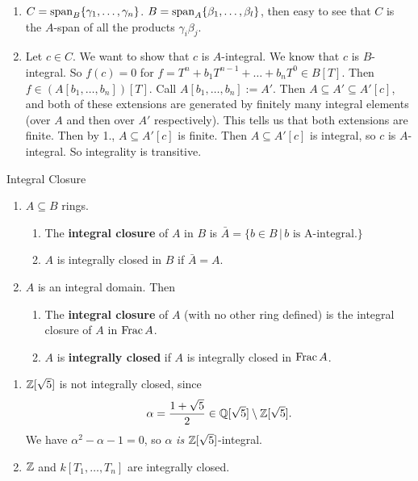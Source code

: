 \documentclass{article}
\begin{document}
\proof \hspace{0.1cm}
\begin{enumerate}
    \item $C = \operatorname{span}_{B} \{\gamma_{1}, \dots, \gamma_{n}\}$. $B = \operatorname{span}_{A}\{ \beta_{1}, \dots, \beta_{l}\}$, then easy to see that $C$ is the $A$-span of all the products $\gamma_{i}\beta_{j}$.
    \item Let $c \in C$. We want to show that $c$ is $A$-integral. We know that $c$ is $B$-integral. So $f(c)=0$ for $f= T^{n} + b_{1}T^{n-1} + \dots + b_{n}T^{0} \in B[T]$. Then $f \in (A[b_{1},\dots, b_{n}])[T]$. Call $A[b_{1}, \dots, b_{n}] := A'$. Then $A \subseteq A' \subseteq A'[c]$, and both of these extensions are generated by finitely many integral elements (over $A$ and then over $A'$ respectively). This tells us that both extensions are finite. Then by 1., $A \subseteq A'[c]$ is finite. Then $A \subseteq A'[c]$ is integral, so $c$ is $A$-integral. So integrality is transitive.
\end{enumerate}
\endproof
\begin{fancydefine}{Integral Closure}
    \hspace{0.1cm}
    \begin{enumerate}
        \item $A \subseteq B$ rings. \begin{enumerate}
            \item The \textbf{integral closure} of $A$ in $B$ is $\bar A = \{ b \in B \, | \, b \text{ is } $A$\text{-integral}.\}$
            \item $A$ is integrally closed in $B$ if $\bar A = A$.
        \end{enumerate} 
        \item $A$ is an integral domain. Then \begin{enumerate}
            \item The \textbf{integral closure} of $A$ (with no other ring defined) is the integral closure of $A$ in $\operatorname{Frac} A$.
            \item $A$ is \textbf{integrally closed} if $A$ is integrally closed in $\operatorname{Frac} A$.
        \end{enumerate}
    \end{enumerate}
\end{fancydefine}
\begin{ex}
    \begin{enumerate}
    \item $\mathbb{Z}[\sqrt{5}]$ is not integrally closed, since \[\alpha = \frac{1 + \sqrt{5}}{2} \in \mathbb{Q}[\sqrt{5}] \setminus \mathbb{Z}[\sqrt{5}].\] We have $\alpha^{2} - \alpha -1=0$, so $\alpha$ \textit{is} $\mathbb{Z}[\sqrt{5}]$-integral.
    \item $\mathbb{Z}$ and $k[T_{1}, \dots, T_{n}]$ are integrally closed.
    \end{enumerate}
\end{ex}
\end{document}
